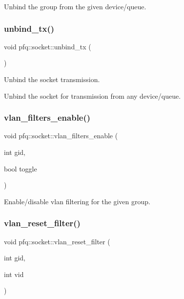 Unbind the group from the given device/queue. 

\mbox{\label{classpfq_1_1socket_a99ee5e145ccf3a043b3c2aacb3df30cc}} 
\subsubsection{\texorpdfstring{unbind\+\_\+tx()}{unbind\_tx()}}
{\footnotesize\ttfamily void pfq\+::socket\+::unbind\+\_\+tx (\begin{DoxyParamCaption}{ }\end{DoxyParamCaption})\hspace{0.3cm}{\ttfamily [inline]}}



Unbind the socket transmission. 

Unbind the socket for transmission from any device/queue. \mbox{\label{classpfq_1_1socket_aaf91b2e089edb2c4695584b01774326e}} 
\subsubsection{\texorpdfstring{vlan\+\_\+filters\+\_\+enable()}{vlan\_filters\_enable()}}
{\footnotesize\ttfamily void pfq\+::socket\+::vlan\+\_\+filters\+\_\+enable (\begin{DoxyParamCaption}\item[{int}]{gid,  }\item[{bool}]{toggle }\end{DoxyParamCaption})\hspace{0.3cm}{\ttfamily [inline]}}



Enable/disable vlan filtering for the given group. 

\mbox{\label{classpfq_1_1socket_a296d1eddfb061c1a658067006ddb9f37}} 
\subsubsection{\texorpdfstring{vlan\+\_\+reset\+\_\+filter()}{vlan\_reset\_filter()}\hspace{0.1cm}{\footnotesize\ttfamily [1/2]}}
{\footnotesize\ttfamily void pfq\+::socket\+::vlan\+\_\+reset\+\_\+filter (\begin{DoxyParamCaption}\item[{int}]{gid,  }\item[{int}]{vid }\end{DoxyParamCaption})\hspace{0.3cm}{\ttfamily [inline]}}



